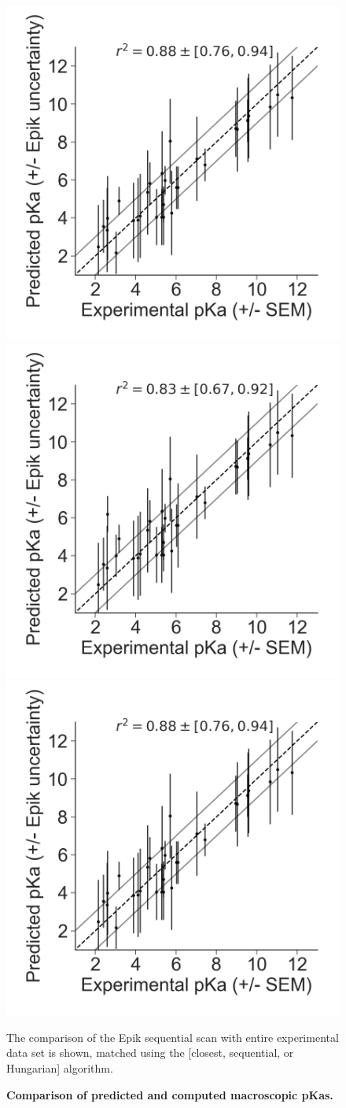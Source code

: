 \documentclass[9pt,lineno]{elife}
\begin{document}
\begin{figure}[H]
    \centering
    \includegraphics[width=0.31\linewidth]{Epik_macropKa_closest_pka.png} \\
    \includegraphics[width=0.31\linewidth]{Epik_macropKa_sequential_aligned_pka.png}
    \includegraphics[width=0.31\linewidth]{Epik_macropKa_hungarian_pka.png}
    \caption{{\bf Comparison of predicted and computed macroscopic pKas.}}
    The comparison of the Epik sequential scan with entire experimental data set is shown, matched using the [closest, sequential, or Hungarian] algorithm.
    \label{fig:correlation-macro}
\end{figure}
\end{document}
